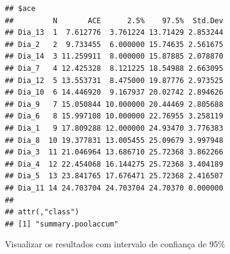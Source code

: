 \documentclass[
]{book}
\begin{document}
\begin{verbatim}
## $ace
##         N       ACE      2.5%    97.5%  Std.Dev
## Dia_13  1  7.612776  3.761224 13.71429 2.853244
## Dia_2   2  9.733455  6.000000 15.74635 2.561675
## Dia_14  3 11.259911  8.000000 15.87885 2.078870
## Dia_7   4 12.425328  8.121225 18.54988 2.663095
## Dia_12  5 13.553731  8.475000 19.87776 2.973525
## Dia_10  6 14.446920  9.167937 20.02742 2.894626
## Dia_9   7 15.050844 10.000000 20.44469 2.805688
## Dia_6   8 15.997108 10.000000 22.76955 3.258119
## Dia_1   9 17.809288 12.000000 24.93470 3.776383
## Dia_8  10 19.377831 13.005455 25.09679 3.997948
## Dia_3  11 21.046964 13.686710 25.72368 3.862266
## Dia_4  12 22.454068 16.144275 25.72368 3.404189
## Dia_5  13 23.841765 17.676471 25.72368 2.416507
## Dia_11 14 24.703704 24.703704 24.70370 0.000000
## 
## attr(,"class")
## [1] "summary.poolaccum"
\end{verbatim}

Visualizar os resultados com intervalo de confiança de 95\%
\end{document}
